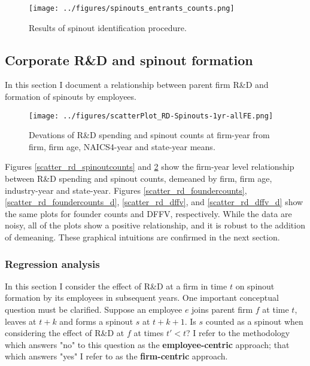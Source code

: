 \documentclass[12pt,english]{article}
\theoremstyle{remark}
\begin{document}
\begin{figure}[p]
	\centering
	\texttt{[image: ../figures/spinouts\_entrants\_counts.png]}
	\caption{Results of spinout identification procedure.}
	\label{spinout_entrants_counts_unweighted}
\end{figure}


\subsection{Corporate R\&D and spinout formation}

In this section I document a relationship between parent firm R\&D and formation of spinouts by employees.

\begin{figure}[p]
	\centering
	\texttt{[image: ../figures/scatterPlot\_RD-Spinouts-1yr-allFE.png]}
	\caption{Devations of R\&D spending and spinout counts at firm-year from firm, firm age, NAICS4-year and state-year means.}
	\label{scatter_rd_spinoutcounts_d}
\end{figure}

Figures \ref{scatter_rd_spinoutcounts} and \ref{scatter_rd_spinoutcounts_d} show the firm-year level relationship between R\&D spending and spinout counts, demeaned by firm, firm age, industry-year and state-year. Figures \ref{scatter_rd_foundercounts}, \ref{scatter_rd_foundercounts_d}, \ref{scatter_rd_dffv}, and \ref{scatter_rd_dffv_d} show the same plots for founder counts and DFFV, respectively. While the data are noisy, all of the plots show a positive relationship, and it is robust to the addition of demeaning. These graphical intuitions are confirmed in the next section.

\subsubsection{Regression analysis}

In this section I consider the effect of R\&D at a firm in time $t$ on spinout formation by its employees in subsequent years. One important conceptual question must be clarified. Suppose an employee $e$ joins parent firm $f$ at time $t$, leaves at $t+k$ and forms a spinout $s$ at $t+k+1$. Is $s$ counted as a spinout when considering the effect of R\&D at $f$ at times $t' < t$? I refer to the methodology which answers "no" to this question as the \textbf{employee-centric} approach; that which answers "yes" I refer to as the \textbf{firm-centric} approach. 
\end{document}
